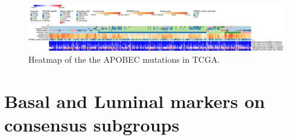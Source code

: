 \begin{figure}[!htb]   
    \centering
    \includegraphics[width=1.0\textwidth,keepaspectratio]{Sections/Network_I/Resources/selective_pruning/sel_tfs/sel_tfs_apobec_meta.png}
      \caption{Heatmap of the the APOBEC mutations in TCGA.}
    \label{fig:ap:sel_tfs_tcga_meta_apobec}
\end{figure}

\newpage 

\section{Basal and Luminal markers on consensus subgroups} \label{s:ap:sel_prun_markers}


